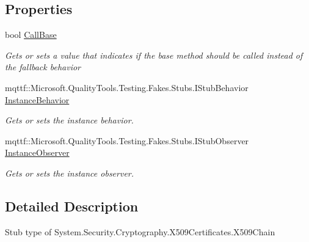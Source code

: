\subsection*{Properties}
\begin{DoxyCompactItemize}
\item 
bool \hyperlink{class_system_1_1_security_1_1_cryptography_1_1_x509_certificates_1_1_fakes_1_1_stub_x509_chain_a012646c5e5a0eaf108b5cbdc6b9f5854}{Call\-Base}
\begin{DoxyCompactList}\small\item\em Gets or sets a value that indicates if the base method should be called instead of the fallback behavior\end{DoxyCompactList}\item 
mqttf\-::\-Microsoft.\-Quality\-Tools.\-Testing.\-Fakes.\-Stubs.\-I\-Stub\-Behavior \hyperlink{class_system_1_1_security_1_1_cryptography_1_1_x509_certificates_1_1_fakes_1_1_stub_x509_chain_abdaed235d5ae4e733a4f562a16aeae53}{Instance\-Behavior}
\begin{DoxyCompactList}\small\item\em Gets or sets the instance behavior.\end{DoxyCompactList}\item 
mqttf\-::\-Microsoft.\-Quality\-Tools.\-Testing.\-Fakes.\-Stubs.\-I\-Stub\-Observer \hyperlink{class_system_1_1_security_1_1_cryptography_1_1_x509_certificates_1_1_fakes_1_1_stub_x509_chain_a0d9780ed31fb7043ff2498ee56985c8a}{Instance\-Observer}
\begin{DoxyCompactList}\small\item\em Gets or sets the instance observer.\end{DoxyCompactList}\end{DoxyCompactItemize}


\subsection{Detailed Description}
Stub type of System.\-Security.\-Cryptography.\-X509\-Certificates.\-X509\-Chain




